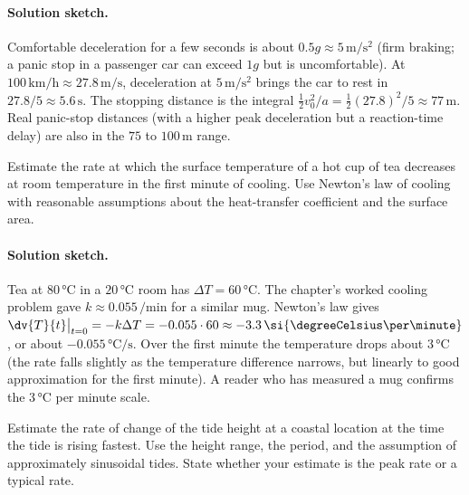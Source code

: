 \paragraph{Solution sketch.}
Comfortable deceleration for a few seconds is about $0.5 g \approx
5 \,\si{\meter\per\second\squared}$ (firm braking; a panic stop
in a passenger car can exceed $1 g$ but is uncomfortable). At
$100 \,\si{\kilo\meter\per\hour} \approx 27.8 \,\si{\meter\per
\second}$, deceleration at $5 \,\si{\meter\per\second\squared}$
brings the car to rest in $27.8 / 5 \approx 5.6 \,\si{\second}$.
The stopping distance is the integral $\tfrac{1}{2} v_{0}^{2} / a
= \tfrac{1}{2} (27.8)^{2} / 5 \approx 77 \,\si{\meter}$. Real
panic-stop distances (with a higher peak deceleration but a
reaction-time delay) are also in the $75$ to $100 \,\si{\meter}$
range.

\begin{exercise}
Estimate the rate at which the surface temperature of a hot cup
of tea decreases at room temperature in the first minute of
cooling. Use Newton's law of cooling with reasonable assumptions
about the heat-transfer coefficient and the surface area.
\end{exercise}

\paragraph{Solution sketch.}
Tea at $80 \,\si{\degreeCelsius}$ in a $20 \,\si{\degreeCelsius}$
room has $\Delta T = 60 \,\si{\degreeCelsius}$. The chapter's
worked cooling problem gave $k \approx 0.055 \,\si{\per\minute}$
for a similar mug. Newton's law gives $\dv{T}{t}\big|_{t=0} =
-k \Delta T = -0.055 \cdot 60 \approx -3.3 \,\si{\degreeCelsius
\per\minute}$, or about $-0.055 \,\si{\degreeCelsius\per\second}$.
Over the first minute the temperature drops about $3 \,\si{
\degreeCelsius}$ (the rate falls slightly as the temperature
difference narrows, but linearly to good approximation for the
first minute). A reader who has measured a mug confirms the
$3 \,\si{\degreeCelsius}$ per minute scale.

\begin{exercise}
Estimate the rate of change of the tide height at a coastal
location at the time the tide is rising fastest. Use the height
range, the period, and the assumption of approximately sinusoidal
tides. State whether your estimate is the peak rate or a typical
rate.
\end{exercise}

